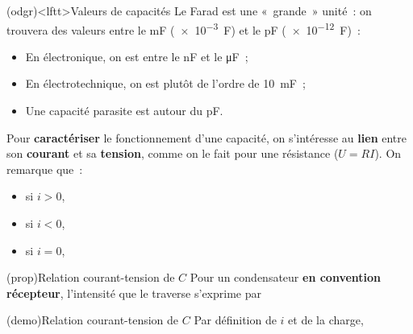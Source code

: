 \documentclass[../../main/main.tex]{subfiles}
\begin{document}
\begin{tcb*}(odgr)<lftt>{Valeurs de capacités}
	Le Farad est une «~grande~» unité~: on trouvera des valeurs entre le \si{mF}
	(\SI{e-3}{F}) et le \si{pF} (\SI{e-12}{F})~:
	\begin{itemize}
		\item En électronique, on est entre le \si{nF} et le \si{\micro F}~;
		\item En électrotechnique, on est plutôt de l'ordre de \SI{10}{mF}~;
		\item Une capacité parasite est autour du \si{pF}.
	\end{itemize}
\end{tcb*}

Pour \textbf{caractériser} le fonctionnement d'une capacité, on s'intéresse au
\textbf{lien} entre son \textbf{courant} et sa \textbf{tension}, comme on le
fait pour une résistance ($U = RI$). On remarque que~:
\begin{itemize}
	\item si $i > 0$, %
	\item si $i < 0$, %
	\item si $i = 0$, %
\end{itemize}


\begin{tcb*}[label=prop:Ccarac](prop){Relation courant-tension de $C$}
	Pour un condensateur \textbf{en convention récepteur}, l'intensité que
	le traverse s'exprime par
	\psw{%
		\[\boxed{i = C \dv{u_C}{t}}\]
	}%
	\vspace{-15pt}
\end{tcb*}
\begin{tcb*}[label=demo:Ccarac](demo){Relation courant-tension de $C$}
	Par définition de $i$ et de la charge,
	\vspace{-15pt}
\end{tcb*}
\end{document}
